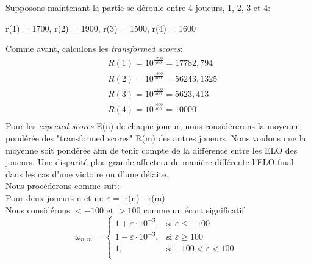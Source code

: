     Supposons maintenant la partie se déroule entre 4 joueurs, 1, 2, 3 et 4:
    \begin{center}
        r(1) = 1700, r(2) = 1900, r(3) = 1500, r(4) = 1600
    \end{center}
    Comme avant, calculons les \textit{transformed scores}:
        \begin{equation}
            \begin{split}
                & R(1) = 10^{\frac{1700}{400}} = 17782,794 \\
                & R(2) = 10^{\frac{1900}{400}} = 56243,1325 \\
                & R(3) = 10^{\frac{1500}{400}} = 5623, 413  \\
                & R(4) = 10^{\frac{1600}{400}} = 10000 \\
            \end{split}
        \end{equation}
        Pour les \textit{expected scores} E(n) de chaque joueur, nous considérerons la moyenne pondérée des "transformed scores" R(m) des autres joueurs.
        Nous voulons que la moyenne soit pondérée afin de tenir compte de la différence entre les ELO des joueurs. Une disparité plus grande affectera
        de manière différente l'ELO final dans les cas d'une victoire ou d'une défaite.  \\
        Nous procéderons comme suit: \\
        Pour deux joueurs n et m: $\varepsilon = $ r(n) - r(m)  \\
        Nous considérons $< -100 \text{ et } > 100$ comme un écart significatif
            $$ \omega_{n, m} =
            \begin{cases}
                1 + \varepsilon \cdot 10^{-3}, & \text{si $\varepsilon \le -100$} \\
                1 - \varepsilon \cdot 10^{-3}, & \text{si $\varepsilon \ge 100$} \\
                1, & \text{si $-100 < \varepsilon < 100$ }\\
            \end{cases} $$

